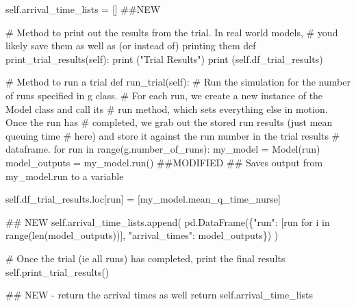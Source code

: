 \documentclass[
  letterpaper,
  DIV=11,
  numbers=noendperiod]{scrreprt}
\newenvironment{Shaded}{}{}
\newcommand{\BuiltInTok}[1]{\textcolor[rgb]{0.84,0.23,0.29}{#1}}
\newcommand{\CommentTok}[1]{\textcolor[rgb]{0.42,0.45,0.49}{#1}}
\newcommand{\ControlFlowTok}[1]{\textcolor[rgb]{0.84,0.23,0.29}{#1}}
\newcommand{\KeywordTok}[1]{\textcolor[rgb]{0.84,0.23,0.29}{#1}}
\newcommand{\NormalTok}[1]{\textcolor[rgb]{0.14,0.16,0.18}{#1}}
\newcommand{\OperatorTok}[1]{\textcolor[rgb]{0.14,0.16,0.18}{#1}}
\newcommand{\StringTok}[1]{\textcolor[rgb]{0.01,0.18,0.38}{#1}}
\newcommand{\VariableTok}[1]{\textcolor[rgb]{0.89,0.38,0.04}{#1}}
\begin{document}
\begin{tcolorbox}
\begin{Shaded}
\begin{Highlighting}[]
        \VariableTok{self}\NormalTok{.arrival\_time\_lists }\OperatorTok{=}\NormalTok{ [] }\CommentTok{\#\#NEW}

    \CommentTok{\# Method to print out the results from the trial.  In real world models,}
    \CommentTok{\# you\textquotesingle{}d likely save them as well as (or instead of) printing them}
    \KeywordTok{def}\NormalTok{ print\_trial\_results(}\VariableTok{self}\NormalTok{):}
        \BuiltInTok{print}\NormalTok{ (}\StringTok{"Trial Results"}\NormalTok{)}
        \BuiltInTok{print}\NormalTok{ (}\VariableTok{self}\NormalTok{.df\_trial\_results)}

    \CommentTok{\# Method to run a trial}
    \KeywordTok{def}\NormalTok{ run\_trial(}\VariableTok{self}\NormalTok{):}
        \CommentTok{\# Run the simulation for the number of runs specified in g class.}
        \CommentTok{\# For each run, we create a new instance of the Model class and call its}
        \CommentTok{\# run method, which sets everything else in motion.  Once the run has}
        \CommentTok{\# completed, we grab out the stored run results (just mean queuing time}
        \CommentTok{\# here) and store it against the run number in the trial results}
        \CommentTok{\# dataframe.}
        \ControlFlowTok{for}\NormalTok{ run }\KeywordTok{in} \BuiltInTok{range}\NormalTok{(g.number\_of\_runs):}
\NormalTok{            my\_model }\OperatorTok{=}\NormalTok{ Model(run)}
\NormalTok{            model\_outputs }\OperatorTok{=}\NormalTok{ my\_model.run() }\CommentTok{\#\#MODIFIED}
            \CommentTok{\#\# Saves output from my\_model.run to a variable}

            \VariableTok{self}\NormalTok{.df\_trial\_results.loc[run] }\OperatorTok{=}\NormalTok{ [my\_model.mean\_q\_time\_nurse]}

            \CommentTok{\#\# NEW}
            \VariableTok{self}\NormalTok{.arrival\_time\_lists.append(}
\NormalTok{              pd.DataFrame(\{}\StringTok{"run"}\NormalTok{: [run }\ControlFlowTok{for}\NormalTok{ i }\KeywordTok{in} \BuiltInTok{range}\NormalTok{(}\BuiltInTok{len}\NormalTok{(model\_outputs))], }\StringTok{"arrival\_times"}\NormalTok{: model\_outputs\})}
\NormalTok{              )}

        \CommentTok{\# Once the trial (ie all runs) has completed, print the final results}
        \VariableTok{self}\NormalTok{.print\_trial\_results()}

        \CommentTok{\#\# NEW {-} return the arrival times as well}
        \ControlFlowTok{return} \VariableTok{self}\NormalTok{.arrival\_time\_lists}
\end{Highlighting}
\end{Shaded}

\end{tcolorbox}
\end{document}
